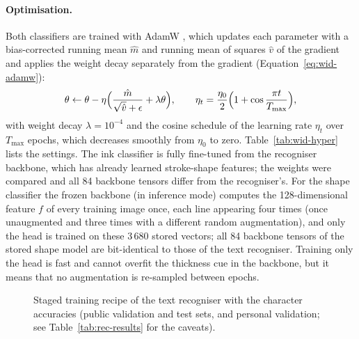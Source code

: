 \paragraph{Optimisation.}
Both classifiers are trained with AdamW \cite{kingma2015,loshchilov2019}, which updates each parameter with a bias-corrected running mean $\hat m$ and running mean of squares $\hat v$ of the gradient and applies the weight decay separately from the gradient (Equation~\ref{eq:wid-adamw}):
\begin{equation}
\theta\leftarrow\theta-\eta\Bigl(\frac{\hat m}{\sqrt{\hat v}+\epsilon}+\lambda\theta\Bigr),\qquad\eta_t=\frac{\eta_0}{2}\Bigl(1+\cos\frac{\pi t}{T_{\max}}\Bigr),
\label{eq:wid-adamw}
\end{equation}
with weight decay $\lambda=10^{-4}$ and the cosine schedule of the learning rate $\eta_t$ over $T_{\max}$ epochs, which decreases smoothly from $\eta_0$ to zero.
Table~\ref{tab:wid-hyper} lists the settings.
The ink classifier is fully fine-tuned from the recogniser backbone, which has already learned stroke-shape features; the weights were compared and all 84 backbone tensors differ from the recogniser's.
For the shape classifier the frozen backbone (in inference mode) computes the 128-dimensional feature $f$ of every training image once, each line appearing four times (once unaugmented and three times with a different random augmentation), and only the head is trained on these 3\,680 stored vectors; all 84 backbone tensors of the stored shape model are bit-identical to those of the text recogniser.
Training only the head is fast and cannot overfit the thickness cue in the backbone, but it means that no augmentation is re-sampled between epochs.



\begin{figure}[h]
\centering
{}
\caption{Staged training recipe of the text recogniser with the character accuracies (public validation and test sets, and personal validation; see Table~\ref{tab:rec-results} for the caveats).}
\label{fig:rec-stages}
\end{figure}

